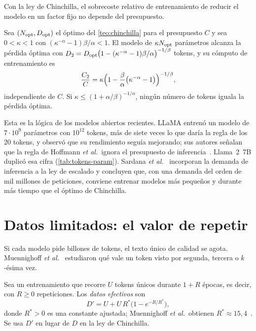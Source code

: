 Con la ley de Chinchilla, el sobrecoste relativo de entrenamiento de reducir el modelo en un factor fijo no depende del presupuesto.

\begin{proposicion}\label{prop:sobrecoste}
Sea $(N_{\mathrm{opt}},D_{\mathrm{opt}})$ el óptimo del \cref{teo:chinchilla} para el presupuesto $C$ y sea $0<\kappa<1$ con $(\kappa^{-\alpha}-1)\beta/\alpha<1$. El modelo de $\kappa N_{\mathrm{opt}}$ parámetros alcanza la pérdida óptima con $D_2=D_{\mathrm{opt}}\bigl(1-(\kappa^{-\alpha}-1)\beta/\alpha\bigr)^{-1/\beta}$ tokens, y su cómputo de entrenamiento es
\[
\frac{C_2}{C}=\kappa\Bigl(1-\frac{\beta}{\alpha}\bigl(\kappa^{-\alpha}-1\bigr)\Bigr)^{-1/\beta},
\]
independiente de $C$. Si $\kappa\le(1+\alpha/\beta)^{-1/\alpha}$, ningún número de tokens iguala la pérdida óptima.
\end{proposicion}

\addtocounter{definicion}{1}%

Esta es la lógica de los modelos abiertos recientes. LLaMA entrenó un modelo de $7\cdot 10^{9}$ parámetros con $10^{12}$ tokens, más de siete veces lo que daría la regla de los 20 tokens, y observó que su rendimiento seguía mejorando; sus autores señalan que la regla de Hoffmann \emph{et al.}\ ignora el presupuesto de inferencia~\cite[§1]{llama}. Llama~2~7B duplicó esa cifra (\cref{tab:tokens-param}). Sardana \emph{et al.}~\cite{sardana} incorporan la demanda de inferencia a la ley de escalado y concluyen que, con una demanda del orden de mil millones de peticiones, conviene entrenar modelos más pequeños y durante más tiempo que el óptimo de Chinchilla.

\section{Datos limitados: el valor de repetir}

Si cada modelo pide billones de tokens, el texto único de calidad se agota. Muennighoff \emph{et al.}~\cite{muennighoff} estudiaron qué vale un token visto por segunda, tercera o $k$-ésima vez.

\begin{definicion}\label{def:efectivos}
Sea un entrenamiento que recorre $U$ tokens únicos durante $1+R$ épocas, es decir, con $R\ge 0$ repeticiones. Los \emph{datos efectivos} son~\cite[§3.1, ecuación~(5)]{muennighoff}
\[
D'=U+U\,R^{*}\bigl(1-e^{-R/R^{*}}\bigr),
\]
donde $R^{*}>0$ es una constante ajustada; Muennighoff \emph{et al.}\ obtienen $R^{*}\approx 15{,}4$~\cite[apéndice~A]{muennighoff}. Se usa $D'$ en lugar de $D$ en la ley de Chinchilla.
\end{definicion}

